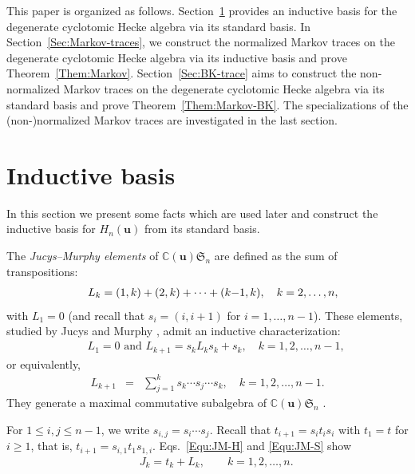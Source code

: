 \documentclass[a4paper, oneside]{amsart}
\numberwithin{equation}{section}
\theoremstyle{definition}
\theoremstyle{remark}
\begin{document}
This paper is organized as follows. Section~\ref{Sec:Inductive-basis} provides an inductive basis for the degenerate cyclotomic Hecke algebra via its standard basis. In Section~\ref{Sec:Markov-traces}, we construct the normalized Markov traces on the degenerate cyclotomic Hecke algebra via its inductive basis and prove Theorem~\ref{Them:Markov}. Section~\ref{Sec:BK-trace} aims to construct the non-normalized Markov traces on the degenerate cyclotomic Hecke algebra via its standard basis and prove Theorem~\ref{Them:Markov-BK}. The specializations of the (non-)normalized Markov traces are investigated in the last section.

\section{Inductive basis}\label{Sec:Inductive-basis}

In this section we present some facts which are used later and construct the inductive basis for $H_n(\boldsymbol{u})$ from its standard basis.


The \textit{Jucys--Murphy elements} of $\mathbb{C}(\boldsymbol{u})\mathfrak{S}_n$ are defined as the sum of transpositions:
\begin{eqnarray*}
  &&L_k=(1,k)+(2,k)+\cdots+(k\negmedspace-\negmedspace1,k),\quad k=2, \ldots, n,
\end{eqnarray*}
with $L_1=0$ (and recall that $s_i=(i,i+1)$ for $i=1,\ldots,n-1$). These elements,   studied by Jucys \cite{Jucys} and Murphy \cite{Murphy}, admit an inductive characterization:
\begin{eqnarray}\label{Equ:JM-S}
&&L_1=0 \text{ and } L_{k+1}=s_kL_{k}s_k+s_k, \quad k=1, 2,\ldots, n-1,
\end{eqnarray}
or equivalently,
\begin{eqnarray*}
L_{k+1}&=&\sum_{j=1}^{k}s_k\cdots s_j\cdots s_k, \quad k=1, 2,\ldots, n-1.
\end{eqnarray*}
They generate a maximal commutative subalgebra of $\mathbb{C}(\boldsymbol{u})\mathfrak{S}_n$  \cite[Eq.~(2.6)]{Murphy}.

For $1\leq i,j\leq n-1$, we write $s_{i,j}=s_i\cdots s_{j}$. Recall that $t_{i+1}=s_{i}t_{i}s_{i}$ with $t_1=t$ for $i\geq1$, that is, $t_{i+1}=s_{i,1}t_{1}s_{1,i}$. Eqs.~\eqref{Equ:JM-H} and \eqref{Equ:JM-S} show
\begin{eqnarray}\label{Equ:J-JM}
  &&J_k=t_k+L_k, \qquad k=1,2, \ldots, n.
\end{eqnarray}
\end{document}
